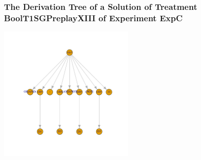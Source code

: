  \begin{frame}
 \frametitle{ The Derivation Tree of a Solution of Treatment BoolT1SGPreplayXIII of Experiment ExpC }
 \begin{center}
\includegraphics[width=0.5\textwidth, angle=0]
{ExpCDerivationTreeFigure000.pdf}
 \end{center}
 \label{report/ExpCDerivationTreeFigure000.pdf}  
 \end{frame}


